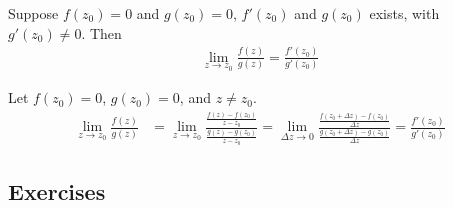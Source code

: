 \documentclass[12pt, english]{book}
\makeatletter
\renewenvironment{proof}[1][\proofname]{\par
	\pushQED{\qed}%
	\normalfont \topsep6\p@\@plus6\p@\relax
	\list{}{%
		\settowidth{\leftmargin}{\itshape\proofname:\hskip\labelsep}%
		\setlength{\labelwidth}{0pt}%
		\setlength{\itemindent}{-\leftmargin}%
		}%
	\item[\hskip\labelsep\itshape#1\@addpunct{:}]\ignorespaces
	}{\popQED\endlist\@endpefalse}
\makeatother
\begin{document}
	\begin{theorem} 
		\label{L'Hopital's Rule - Complex}
		Suppose \(f(z_0) = 0\) and \(g(z_0) = 0\), \(f'(z_0)\) and \(g(z_0)\) exists, with \(g'(z_0) \neq 0\). Then 
		\begin{align*}
			\lim_{z \rightarrow z_0} \frac{f(z)}{g(z)} = \frac{f'(z_0)}{g'(z_0)}
		\end{align*}
	\end{theorem}
	\begin{proof}
		Let \(f(z_0) = 0\), \(g(z_0) = 0\), and \(z \neq z_0\).
		\begin{align*}
			\lim_{z \rightarrow z_0} \frac{f(z)}{g(z)}
				&= \lim_{z \rightarrow z_0} \frac{\frac{f(z)-f(z_0)}{z-z_0}}{\frac{g(z)-g(z_0)}{z-z_0}}
				= \lim_{\Delta z \rightarrow 0}
				\frac{\frac{f(z_0 + \Delta z)-f(z_0)}{\Delta z}}{\frac{g(z_0 + \Delta z)-g(z_0)}{\Delta z}}
				=\frac{f'(z_0)}{g'(z_0)}
		\end{align*}
	\end{proof}
	
	
	\subsection{Exercises}
	
\end{document}
